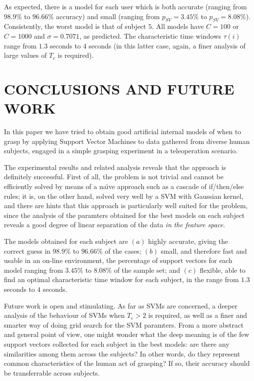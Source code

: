 \documentclass{article}
\begin{document}
As expected, there is a model for each user which is both accurate
(ranging from $98.9\%$ to $96.66\%$ accuracy) and small (ranging from
$p_{SV}=3.45\%$ to $p_{SV}=8.08\%$). Consistently, the worst model is
that of subject $5$. All models have $C=100$ or $C=1000$ and
$\sigma=0.7071$, as predicted. The characteristic time windows
$\tau(i)$ range from $1.3$ seconds to $4$ seconds (in this latter
case, again, a finer analysis of large values of $T_c$ is required).

\section{CONCLUSIONS AND FUTURE WORK}
\label{sec:con}

In this paper we have tried to obtain good artificial internal models
of when to grasp by applying Support Vector Machines to data gathered
from diverse human subjects, engaged in a simple grasping experiment in
a teleoperation scenario.

The experimental results and related analysis reveals that the
approach is definitely successful. First of all, the problem is not
trivial and cannot be efficiently solved by means of a na\"\i ve
approach such as a cascade of if/then/else rules; it is, on the other
hand, solved very well by a SVM with Gaussian kernel, and there are
hints that this approach is particularly well suited for the problem,
since the analysis of the paramters obtained for the best models on
each subject reveals a good degree of linear separation of the data
\emph{in the feature space}.

The models obtained for each subject are $(a)$ highly accurate, giving
the correct guess in $98.9\%$ to $96.66\%$ of the cases; $(b)$ small,
and therefore fast and usable in an on-line environment, the
percentage of support vectors for each model ranging from $3.45\%$ to
$8.08\%$ of the sample set; and $(c)$ flexible, able to find an
optimal characteristic time window for each subject, in the range from
$1.3$ seconds to $4$ seconds.

Future work is open and stimulating. As far as SVMs are concerned, a
deeper analysis of the behaviour of SVMs when $T_c>2$ is required, as
well as a finer and smarter way of doing grid search for the SVM
paramters. From a more abstract and general point of view, one might
wonder what the deep meaning is of the few support vectors collected
for each subject in the best models: are there any similarities among
them across the subjects? In other words, do they represent common
characteristics of the human act of grasping? If so, their accuracy
should be transferrable across subjects.
\end{document}
